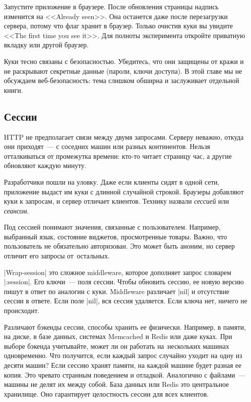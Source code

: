 Запустите приложение в браузере. После обновления страницы надпись изменится на
<<Already seen>>. Она останется даже после перезагрузки сервера, потому что флаг
хранит в браузер. Только очистив куки вы увидите <<The first time you see
it>>. Для полноты эксперимента откройте приватную вкладку или другой браузер.

Куки тесно связаны с безопасностью. Убедитесь, что они защищены от кражи и не
раскрывают секретные данные (пароли, ключи доступа). В этой главе мы не
обсуждаем веб-безопасность: тема слишком обширна и заслуживает отдельной книги.

\subsection{Сессии}

HTTP не предполагает связи между двумя запросами. Серверу неважно, откуда они
приходят~--- с соседних машин или разных континентов. Нельзя отталкиваться от
промежутка времени: кто-то читает страницу час, а другие обновляют каждую
минуту.

Разработчики пошли на уловку. Даже если клиенты сидят в одной сети, приложение
выдаст им куки с длинной случайной строкой. Браузеры добавляют куки к запросам,
и сервер отличает клиентов. Технику назвали \emph{сессией} или \emph{сеансом}.

Под сессией понимают значения, связанные с пользователем. Например, выбранный
язык, состояние виджетов, просмотренные товары. Важно, что пользователь не
обязательно авторизован. Это может быть аноним, но сервер отличит его запросы
от~остальных.

\spverb|Wrap-session| это сложное middleware, которое дополняет запрос словарем
\spverb|:session|. Его ключи~--- поля сессии. Чтобы обновить сессию, ее новую
версию пишут в ответ по аналогии с куки. Middleware различает \spverb|nil| и
отсутствие сессии в ответе. Если поле \spverb|nil|, вся сессия удаляется. Если
ключа нет, ничего не происходит.

Различают бэкенды сессии, способы хранить ее физически. Например, в памяти, на
диске, в базе данных, системах Memcached и Redis или даже куках. При выборе
бэкенда учитывайте, может ли он работать на~нескольких машинах одновременно. Что
получится, если каждый запрос случайно уходит на одну из десяти машин? Если
сессию хранят памяти, на каждой машине будет разная ее копия. Это чревато
странным поведением и отладкой. Аналогично с файлами~--- машины не делят их
между собой. База данных или Redis это центральное хранилище. Оно гарантирует
целостность сессии для всех клиентов.

